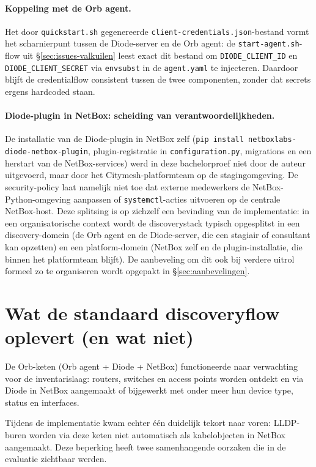 \paragraph{Koppeling met de Orb agent.} Het door \texttt{quickstart.sh} gegenereerde \texttt{client-credentials.json}-bestand vormt het scharnierpunt tussen de Diode-server en de Orb agent: de \texttt{start-agent.sh}-flow uit \S\ref{sec:issues-valkuilen} leest exact dit bestand om \texttt{DIODE\_CLIENT\_ID} en \texttt{DIODE\_CLIENT\_SECRET} via \texttt{envsubst} in de \texttt{agent.yaml} te injecteren. Daardoor blijft de credentialflow consistent tussen de twee componenten, zonder dat secrets ergens hardcoded staan.

\paragraph{Diode-plugin in NetBox: scheiding van verantwoordelijkheden.} De installatie van de Diode-plugin in NetBox zelf (\texttt{pip install netbox\-labs-diode-netbox-plugin}, plugin-registratie in \texttt{configuration.py}, migrations en een herstart van de NetBox-services) werd in deze bachelorproef niet door de auteur uitgevoerd, maar door het Citymesh-platformteam op de stagingomgeving. De security-policy laat namelijk niet toe dat externe medewerkers de NetBox-Python-omgeving aanpassen of \texttt{systemctl}-acties uitvoeren op de centrale NetBox-host. Deze splitsing is op zichzelf een bevinding van de implementatie: in een organisatorische context wordt de discoverystack typisch opgesplitst in een discovery-domein (de Orb agent en de Diode-server, die een stagiair of consultant kan opzetten) en een platform-domein (NetBox zelf en de plugin-installatie, die binnen het platformteam blijft). De aanbeveling om dit ook bij verdere uitrol formeel zo te organiseren wordt opgepakt in \S\ref{sec:aanbevelingen}.

\section{Wat de standaard discoveryflow oplevert (en wat niet)}
\label{sec:wat-orb-oplevert}

De Orb-keten (Orb agent + Diode + NetBox) functioneerde naar verwachting voor de inventarislaag: routers, switches en access points worden ontdekt en via Diode in NetBox aangemaakt of bijgewerkt met onder meer hun device type, status en interfaces.

Tijdens de implementatie kwam echter \'e\'en duidelijk tekort naar voren: LLDP-buren worden via deze keten niet automatisch als kabelobjecten in NetBox aangemaakt. Deze beperking heeft twee samenhangende oorzaken die in de evaluatie zichtbaar werden.

